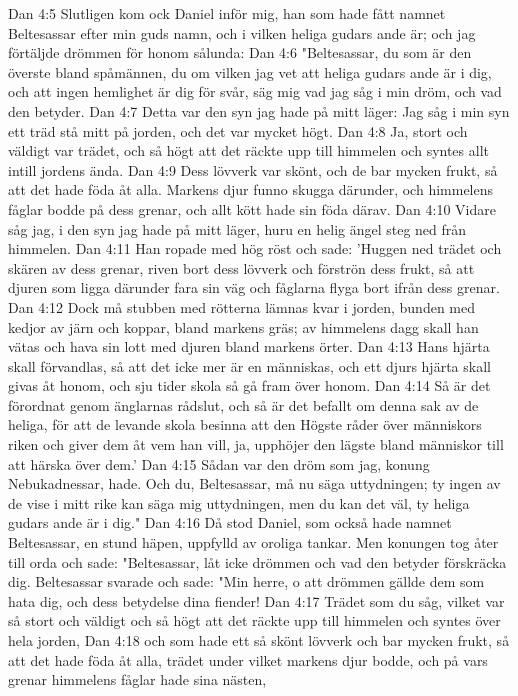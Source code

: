 Dan 4:5  Slutligen kom ock Daniel inför mig, han som hade fått namnet Beltesassar efter min guds namn, och i vilken heliga gudars ande är; och jag förtäljde drömmen för honom sålunda:
Dan 4:6  "Beltesassar, du som är den överste bland spåmännen, du om vilken jag vet att heliga gudars ande är i dig, och att ingen hemlighet är dig för svår, säg mig vad jag såg i min dröm, och vad den betyder.
Dan 4:7  Detta var den syn jag hade på mitt läger: Jag såg i min syn ett träd stå mitt på jorden, och det var mycket högt.
Dan 4:8  Ja, stort och väldigt var trädet, och så högt att det räckte upp till himmelen och syntes allt intill jordens ända.
Dan 4:9  Dess lövverk var skönt, och de bar mycken frukt, så att det hade föda åt alla. Markens djur funno skugga därunder, och himmelens fåglar bodde på dess grenar, och allt kött hade sin föda därav.
Dan 4:10  Vidare såg jag, i den syn jag hade på mitt läger, huru en helig ängel steg ned från himmelen.
Dan 4:11  Han ropade med hög röst och sade: 'Huggen ned trädet och skären av dess grenar, riven bort dess lövverk och förströn dess frukt, så att djuren som ligga därunder fara sin väg och fåglarna flyga bort ifrån dess grenar.
Dan 4:12  Dock må stubben med rötterna lämnas kvar i jorden, bunden med kedjor av järn och koppar, bland markens gräs; av himmelens dagg skall han vätas och hava sin lott med djuren bland markens örter.
Dan 4:13  Hans hjärta skall förvandlas, så att det icke mer är en människas, och ett djurs hjärta skall givas åt honom, och sju tider skola så gå fram över honom.
Dan 4:14  Så är det förordnat genom änglarnas rådslut, och så är det befallt om denna sak av de heliga, för att de levande skola besinna att den Högste råder över människors riken och giver dem åt vem han vill, ja, upphöjer den lägste bland människor till att härska över dem.'
Dan 4:15  Sådan var den dröm som jag, konung Nebukadnessar, hade. Och du, Beltesassar, må nu säga uttydningen; ty ingen av de vise i mitt rike kan säga mig uttydningen, men du kan det väl, ty heliga gudars ande är i dig."
Dan 4:16  Då stod Daniel, som också hade namnet Beltesassar, en stund häpen, uppfylld av oroliga tankar. Men konungen tog åter till orda och sade: "Beltesassar, låt icke drömmen och vad den betyder förskräcka dig. Beltesassar svarade och sade: "Min herre, o att drömmen gällde dem som hata dig, och dess betydelse dina fiender!
Dan 4:17  Trädet som du såg, vilket var så stort och väldigt och så högt att det räckte upp till himmelen och syntes över hela jorden,
Dan 4:18  och som hade ett så skönt lövverk och bar mycken frukt, så att det hade föda åt alla, trädet under vilket markens djur bodde, och på vars grenar himmelens fåglar hade sina nästen,

